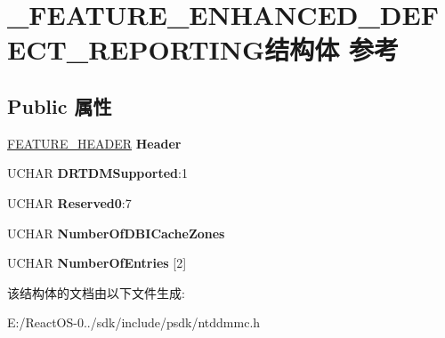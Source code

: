 \hypertarget{struct___f_e_a_t_u_r_e___e_n_h_a_n_c_e_d___d_e_f_e_c_t___r_e_p_o_r_t_i_n_g}{}\section{\+\_\+\+F\+E\+A\+T\+U\+R\+E\+\_\+\+E\+N\+H\+A\+N\+C\+E\+D\+\_\+\+D\+E\+F\+E\+C\+T\+\_\+\+R\+E\+P\+O\+R\+T\+I\+N\+G结构体 参考}
\label{struct___f_e_a_t_u_r_e___e_n_h_a_n_c_e_d___d_e_f_e_c_t___r_e_p_o_r_t_i_n_g}
\subsection*{Public 属性}
\begin{DoxyCompactItemize}
\item 
\mbox{\label{struct___f_e_a_t_u_r_e___e_n_h_a_n_c_e_d___d_e_f_e_c_t___r_e_p_o_r_t_i_n_g_a1cc19860778e9160e16f2a9b3e379938}} 
\hyperlink{struct___f_e_a_t_u_r_e___h_e_a_d_e_r}{F\+E\+A\+T\+U\+R\+E\+\_\+\+H\+E\+A\+D\+ER} {\bfseries Header}
\item 
\mbox{\label{struct___f_e_a_t_u_r_e___e_n_h_a_n_c_e_d___d_e_f_e_c_t___r_e_p_o_r_t_i_n_g_a7e7022687a9f083784c1931a5c066107}} 
U\+C\+H\+AR {\bfseries D\+R\+T\+D\+M\+Supported}\+:1
\item 
\mbox{\label{struct___f_e_a_t_u_r_e___e_n_h_a_n_c_e_d___d_e_f_e_c_t___r_e_p_o_r_t_i_n_g_aab6bb5894710b5ec3f3cd9a4cb6e2385}} 
U\+C\+H\+AR {\bfseries Reserved0}\+:7
\item 
\mbox{\label{struct___f_e_a_t_u_r_e___e_n_h_a_n_c_e_d___d_e_f_e_c_t___r_e_p_o_r_t_i_n_g_a472f16f4298db633697e62d29ae83d29}} 
U\+C\+H\+AR {\bfseries Number\+Of\+D\+B\+I\+Cache\+Zones}
\item 
\mbox{\label{struct___f_e_a_t_u_r_e___e_n_h_a_n_c_e_d___d_e_f_e_c_t___r_e_p_o_r_t_i_n_g_a38886cbfb1fc0088ac9017768d240c9c}} 
U\+C\+H\+AR {\bfseries Number\+Of\+Entries} \mbox{[}2\mbox{]}
\end{DoxyCompactItemize}


该结构体的文档由以下文件生成\+:\begin{DoxyCompactItemize}
\item 
E\+:/\+React\+O\+S-\/0../sdk/include/psdk/ntddmmc.\+h\end{DoxyCompactItemize}
